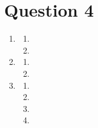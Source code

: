 \documentclass{article}
\begin{document}
\section*{Question 4} 
\begin{enumerate}[label = (\alph*)]
    \item
    \begin{enumerate}[label = (\roman*)]
    \item
    
    \item
    
	\end{enumerate}
	
	\item
    \begin{enumerate}[label = (\roman*)]
    \item
    
    \item
    
	\end{enumerate}
	
	\item
    \begin{enumerate}[label = (\roman*)]
    \item
    
    \item
    
    \item
    
    \item
    
	\end{enumerate}
    
\end{enumerate}


\clearpage
\newpage
\end{document}
